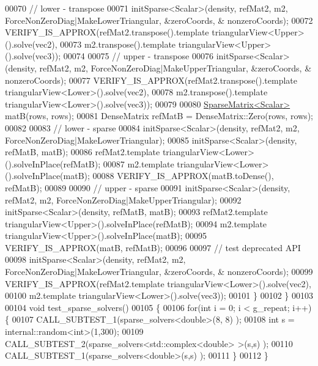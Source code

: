 \begin{DoxyCode}
00070     \textcolor{comment}{// lower - transpose}
00071     initSparse<Scalar>(density, refMat2, m2, ForceNonZeroDiag|MakeLowerTriangular, &zeroCoords, &
      nonzeroCoords);
00072     VERIFY\_IS\_APPROX(refMat2.transpose().template triangularView<Upper>().solve(vec2),
00073                      m2.transpose().template triangularView<Upper>().solve(vec3));
00074 
00075     \textcolor{comment}{// upper - transpose}
00076     initSparse<Scalar>(density, refMat2, m2, ForceNonZeroDiag|MakeUpperTriangular, &zeroCoords, &
      nonzeroCoords);
00077     VERIFY\_IS\_APPROX(refMat2.transpose().template triangularView<Lower>().solve(vec2),
00078                      m2.transpose().template triangularView<Lower>().solve(vec3));
00079 
00080     \hyperlink{group___sparse_core___module}{SparseMatrix<Scalar>} matB(rows, rows);
00081     DenseMatrix refMatB = DenseMatrix::Zero(rows, rows);
00082 
00083     \textcolor{comment}{// lower - sparse}
00084     initSparse<Scalar>(density, refMat2, m2, ForceNonZeroDiag|MakeLowerTriangular);
00085     initSparse<Scalar>(density, refMatB, matB);
00086     refMat2.template triangularView<Lower>().solveInPlace(refMatB);
00087     m2.template triangularView<Lower>().solveInPlace(matB);
00088     VERIFY\_IS\_APPROX(matB.toDense(), refMatB);
00089 
00090     \textcolor{comment}{// upper - sparse}
00091     initSparse<Scalar>(density, refMat2, m2, ForceNonZeroDiag|MakeUpperTriangular);
00092     initSparse<Scalar>(density, refMatB, matB);
00093     refMat2.template triangularView<Upper>().solveInPlace(refMatB);
00094     m2.template triangularView<Upper>().solveInPlace(matB);
00095     VERIFY\_IS\_APPROX(matB, refMatB);
00096 
00097     \textcolor{comment}{// test deprecated API}
00098     initSparse<Scalar>(density, refMat2, m2, ForceNonZeroDiag|MakeLowerTriangular, &zeroCoords, &
      nonzeroCoords);
00099     VERIFY\_IS\_APPROX(refMat2.template triangularView<Lower>().solve(vec2),
00100                      m2.template triangularView<Lower>().solve(vec3));
00101   \}
00102 \}
00103 
00104 \textcolor{keywordtype}{void} test\_sparse\_solvers()
00105 \{
00106   \textcolor{keywordflow}{for}(\textcolor{keywordtype}{int} i = 0; i < g\_repeat; i++) \{
00107     CALL\_SUBTEST\_1(sparse\_solvers<double>(8, 8) );
00108     \textcolor{keywordtype}{int} s = internal::random<int>(1,300);
00109     CALL\_SUBTEST\_2(sparse\_solvers<std::complex<double> >(s,s) );
00110     CALL\_SUBTEST\_1(sparse\_solvers<double>(s,s) );
00111   \}
00112 \}
\end{DoxyCode}
